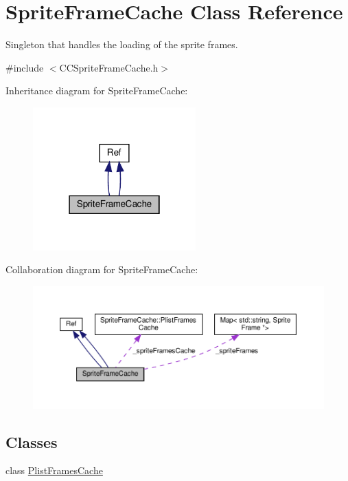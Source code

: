 \hypertarget{classSpriteFrameCache}{}\section{Sprite\+Frame\+Cache Class Reference}
\label{classSpriteFrameCache}


Singleton that handles the loading of the sprite frames.  




{\ttfamily \#include $<$C\+C\+Sprite\+Frame\+Cache.\+h$>$}



Inheritance diagram for Sprite\+Frame\+Cache\+:
\nopagebreak
\begin{figure}[H]
\begin{center}
\leavevmode
\includegraphics[width=178pt]{classSpriteFrameCache__inherit__graph}
\end{center}
\end{figure}


Collaboration diagram for Sprite\+Frame\+Cache\+:
\nopagebreak
\begin{figure}[H]
\begin{center}
\leavevmode
\includegraphics[width=350pt]{classSpriteFrameCache__coll__graph}
\end{center}
\end{figure}
\subsection*{Classes}
\begin{DoxyCompactItemize}
\item 
class \hyperlink{classSpriteFrameCache_1_1PlistFramesCache}{Plist\+Frames\+Cache}
\end{DoxyCompactItemize}
